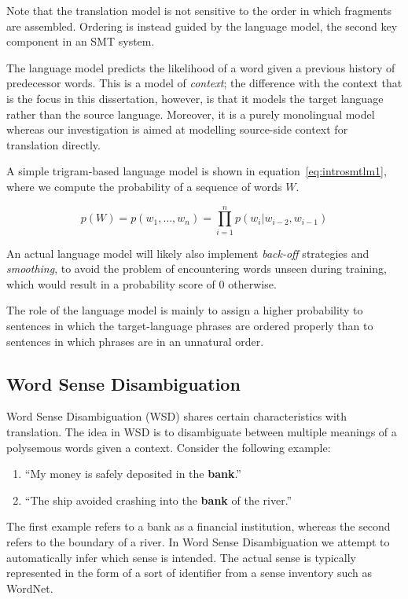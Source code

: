Note that the translation model is not sensitive to the order in which
fragments are assembled. Ordering is instead guided by the language model,
the second key component in an SMT system.

The language model predicts the likelihood of a word given a previous history
of predecessor words. This is a model of \emph{context}; the difference with
the context that is the focus in this dissertation, however, is that it models
the target language rather than the source language. Moreover, it is a purely
monolingual model whereas our investigation is aimed at modelling source-side
context for translation directly.

A simple trigram-based language model is shown in equation~\ref{eq:introsmtlm1}, where we compute the probability of a sequence of words $W$.

\begin{equation}
p(W) = p(w_1,\ldots,w_n) = \prod_{i=1}^{n} p(w_i|w_{i-2},w_{i-1})
\label{eq:introsmtlm1}
\end{equation}

An actual language model will likely also implement \emph{back-off} strategies and
\emph{smoothing}, to avoid the problem of encountering words unseen during
training, which would result in a probability score of $0$ otherwise.

The role of the language model is mainly to assign a higher probability to
sentences in which the target-language phrases are ordered properly than
to sentences in which phrases are in an unnatural order.

\subsection{Word Sense Disambiguation}

Word Sense Disambiguation (WSD) shares certain characteristics with
translation. The idea in WSD is to disambiguate between multiple meanings of a
polysemous words given a context. Consider the following example:

\begin{enumerate}
\item ``My money is safely deposited in the \textbf{bank}.''
\item ``The ship avoided crashing into the \textbf{bank} of the river.''
\end{enumerate}

The first example refers to a bank as a financial institution, whereas the
second refers to the boundary of a river. In Word Sense Disambiguation we
attempt to automatically infer which sense is intended. The actual sense is
typically represented in the form of a sort of identifier from a sense inventory
such as WordNet.

